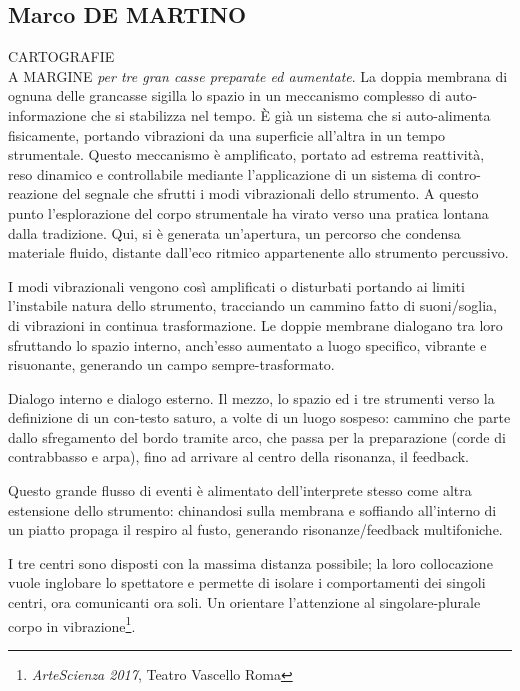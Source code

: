\documentclass[
	a0,
	portrait
	]{a0poster}
\begin{document}
\begin{multicols}{4}
\section*{\color{cyellow}Marco DE MARTINO}

\lettrine{CARTOGRAFIE}{} \\ \lettrine{A MARGINE}{} \emph{per tre gran casse preparate ed aumentate}.
La doppia membrana di ognuna delle grancasse sigilla lo spazio in un meccanismo complesso di auto-informazione che si stabilizza nel tempo. È già un sistema che si auto-alimenta fisicamente, portando vibrazioni da una superficie all'altra in un tempo strumentale. Questo meccanismo è amplificato, portato ad estrema reattività, reso dinamico e controllabile mediante l'applicazione di un sistema di contro-reazione del segnale che sfrutti i modi vibrazionali dello strumento. A questo punto l’esplorazione del corpo strumentale ha virato verso una pratica lontana dalla tradizione. Qui, si è generata un’apertura, un percorso che condensa materiale fluido, distante dall’eco ritmico appartenente allo strumento percussivo. 

I modi vibrazionali vengono così amplificati o disturbati portando ai limiti l’instabile natura dello strumento, tracciando un cammino fatto di suoni/soglia, di vibrazioni in continua trasformazione. Le doppie membrane dialogano tra loro sfruttando lo spazio interno, anch'esso aumentato a luogo specifico, vibrante e risuonante, generando un campo sempre-trasformato.

Dialogo interno e dialogo esterno. Il mezzo, lo spazio ed i tre strumenti verso la definizione di un con-testo saturo, a volte di un luogo sospeso: cammino che parte dallo sfregamento del bordo tramite arco, che passa per la preparazione (corde di contrabbasso e arpa), fino ad arrivare al centro della risonanza, il feedback.

Questo grande flusso di eventi è alimentato dell’interprete stesso come altra estensione dello strumento: chinandosi sulla membrana e soffiando all’interno di un piatto propaga il respiro al fusto, generando risonanze/feedback multifoniche. 

I tre centri sono disposti con la massima distanza possibile; la loro collocazione vuole inglobare lo spettatore  e permette di isolare i comportamenti dei singoli centri, ora comunicanti ora soli. Un orientare l’attenzione al singolare-plurale corpo in vibrazione\footnote{\color{cpurple} \emph{ArteScienza 2017}, Teatro Vascello Roma}. 

\bigskip


\end{multicols}
\end{document}
